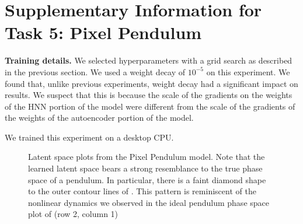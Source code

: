 \documentclass{article}
\begin{document}
\section{Supplementary Information for Task 5: Pixel Pendulum} \label{appendix:pixels}

\textbf{Training details.} We selected hyperparameters with a grid search as described in the previous section. We used a weight decay of $10^{-5}$ on this experiment. We found that, unlike previous experiments, weight decay had a significant impact on results. We suspect that this is because the scale of the gradients on the weights of the HNN portion of the model were different from the scale of the gradients of the weights of the autoencoder portion of the model.

We trained this experiment on a desktop CPU.

\begin{figure}[H]
\centering
{}
\caption{Latent space plots from the Pixel Pendulum model. Note that the learned latent space bears a strong resemblance to the true phase space of a pendulum. In particular, there is a faint diamond shape to the outer contour lines of . This pattern is reminiscent of the nonlinear dynamics we observed in the ideal pendulum phase space plot of  (row 2, column 1)}
\end{figure}
\end{document}
